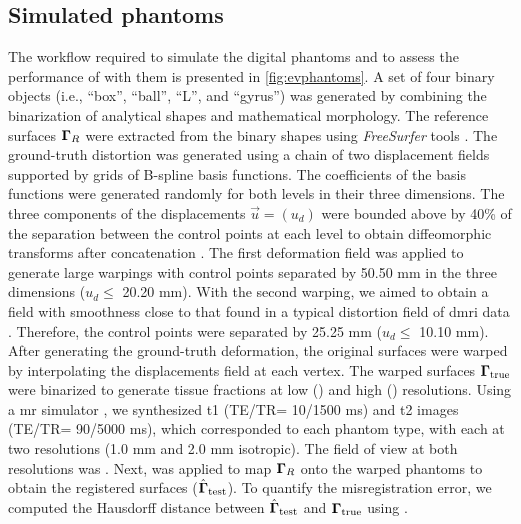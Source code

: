 \subsection{Simulated phantoms}\label{sec:digital_phantoms}
The workflow required to simulate the digital phantoms and to assess the performance of
  \regseg{} with them is presented in \autoref{fig:evphantoms}.
A set of four binary objects (i.e., ``box'', ``ball'', ``L'',
  and ``gyrus'') was generated by combining the binarization of
  analytical shapes and mathematical morphology.
The reference surfaces $\boldsymbol{\Gamma}_R$ were extracted from the binary shapes
  using \emph{FreeSurfer} tools \citep{fischl_freesurfer_2012}.
The ground-truth distortion was generated using a chain of two displacement
  fields supported by grids of B-spline basis functions.
The coefficients of the basis functions were generated randomly for
  both levels in their three dimensions.
The three components of the displacements $\vec{u} = (u_d)$
  were bounded above by 40\% of the separation between the control points
  at each level to obtain diffeomorphic transforms
  after concatenation \citep{rueckert_diffeomorphic_2006}.
The first deformation field was applied to generate large warpings
  with control points separated by 50.50 mm in the three dimensions
  ($u_d\leq$ 20.20 mm).
With the second warping, we aimed to obtain a field with smoothness
  close to that found in a typical distortion field of \gls*{dmri} data
  \citep{irfanoglu_susceptibility_2011}.
Therefore, the control points were separated by 25.25 mm ($u_d\leq$ 10.10 mm).
After generating the ground-truth deformation, the original surfaces
  were warped by interpolating the displacements field at each vertex.
The warped surfaces $\boldsymbol{\Gamma}_\text{true}$ were binarized to generate tissue fractions
  at low () and high () resolutions.
Using a \gls*{mr} simulator \citep{caruyer_phantomas_2014}, we synthesized
  \gls*{t1} (TE/TR= 10/1500 ms) and \gls*{t2} images (TE/TR= 90/5000 ms), which
  corresponded to each phantom type, with each at two resolutions
  (1.0 mm and 2.0 mm isotropic).
The field of view at both resolutions was .
Next, \regseg{} was applied to map $\boldsymbol{\Gamma}_R$ onto the warped phantoms to
  obtain the registered surfaces ($\hat{\boldsymbol{\Gamma}}_\text{test}$).
To quantify the misregistration error, we computed the Hausdorff distance between
 $\hat{\boldsymbol{\Gamma}}_\text{test}$ and $\boldsymbol{\Gamma}_\text{true}$ using \citep{commandeur_vtk_2011}.

